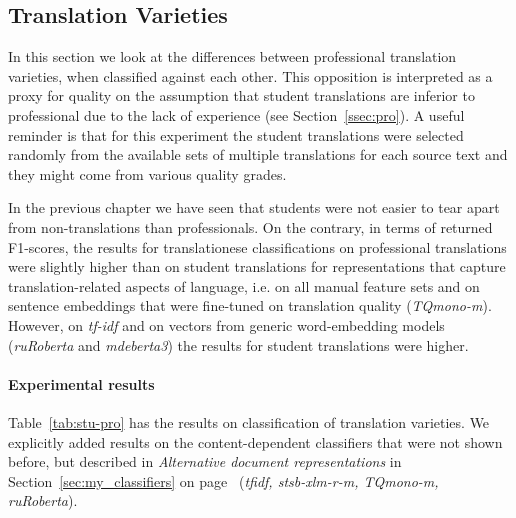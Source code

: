 \subsection{\label{ssec:var}Translation Varieties}

In this section we look at the differences between professional translation varieties, when classified against each other. This opposition is interpreted as a proxy for quality on the assumption that student translations are inferior to professional due to the lack of experience (see Section~\ref{ssec:pro}). A useful reminder is that for this experiment the student translations were selected randomly from the available sets of multiple translations for each source text and they might come from various quality grades. 

In the previous chapter we have seen that students were not easier to tear apart from non-translations than professionals. On the contrary, in terms of returned F1-scores, the results for translationese classifications on professional translations were slightly higher than on student translations for representations that capture translation-related aspects of language, i.e. on all manual feature sets and on sentence embeddings that were fine-tuned on translation quality (\textit{TQmono-m}). However, on \textit{tf-idf} and on vectors from generic word-embedding models (\textit{ruRoberta} and \textit{mdeberta3}) the results for student translations were higher.

\paragraph{Experimental results}
Table~\ref{tab:stu-pro} has the results on classification of translation varieties. We explicitly added results on the content-dependent classifiers that were not shown before, but described in \textit{Alternative document representations} in Section~\ref{sec:my_classifiers} on page~\pageref{pg:vectors} (\textit{tfidf, stsb-xlm-r-m, TQmono-m, ruRoberta}).

